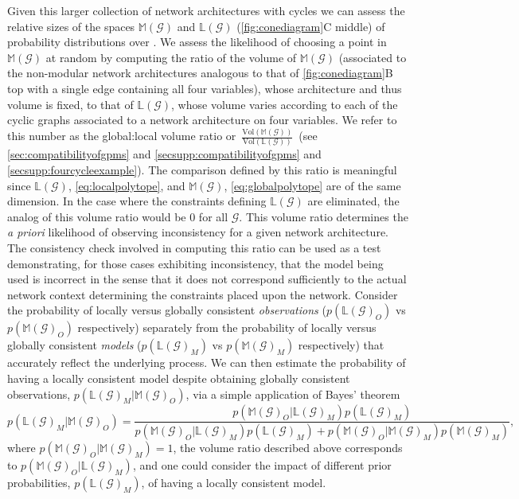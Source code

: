 Given this larger collection of network architectures with cycles we can assess the relative sizes of the spaces $\mathbb{M}(\mathcal{G})$ and $\mathbb{L}(\mathcal{G})$ (\ref{fig:conediagram}C middle) of probability distributions over \gnpm{}. We assess the likelihood of choosing a point in $\mathbb{M}(\mathcal{G})$ at random by computing the ratio of the volume of $\mathbb{M}(\mathcal{G})$ (associated to the non-modular network architectures analogous to that of \ref{fig:conediagram}B top with a single edge containing all four variables), whose architecture and thus volume is fixed, to that of $\mathbb{L}(\mathcal{G})$, whose volume varies according to each of the cyclic graphs associated to a network architecture on four variables. We refer to this number as the global:local volume ratio or~$\frac{\text{Vol}(\mathbb{M}(\mathcal{G}))}{\text{Vol}(\mathbb{L}(\mathcal{G}))}$~(see \ref{sec:compatibilityofgpms} and  \ref{secsupp:compatibilityofgpms} and \ref{secsupp:fourcycleexample}). The comparison defined by this ratio is meaningful since $\mathbb{L}(\mathcal{G})$, \ref{eq:localpolytope}, and $\mathbb{M}(\mathcal{G})$, \ref{eq:globalpolytope} are of the same dimension. In the case where the constraints defining $\mathbb{L}(\mathcal{G})$ are eliminated, the analog of this volume ratio would be $0$ for all $\mathcal{G}$. This volume ratio determines the \emph{a priori} likelihood of observing inconsistency for a given network architecture. The consistency check involved in computing this ratio can be used as a test demonstrating, for those cases exhibiting inconsistency, that the model being used is incorrect in the sense that it does not correspond sufficiently to the actual network context determining the constraints placed upon the network. Consider the probability of locally versus globally consistent \emph{observations} ($p(\mathbb{L}(\mathcal{G})_O)$  vs $p(\mathbb{M}(\mathcal{G})_O)$ respectively) separately from the probability of locally versus globally consistent \emph{models} ($p(\mathbb{L}(\mathcal{G})_M)$  vs $p(\mathbb{M}(\mathcal{G})_M)$ respectively) that accurately reflect the underlying process. We can then estimate the probability of having a locally consistent model despite obtaining globally consistent observations, $p(\mathbb{L}(\mathcal{G})_M | \mathbb{M}(\mathcal{G})_O)$, via a simple application of Bayes' theorem
$$
p(\mathbb{L}(\mathcal{G})_M | \mathbb{M}(\mathcal{G})_O) = \frac{p(\mathbb{M}(\mathcal{G})_O | \mathbb{L}(\mathcal{G})_M)p(\mathbb{L}(\mathcal{G})_M)}{p(\mathbb{M}(\mathcal{G})_O | \mathbb{L}(\mathcal{G})_M)p(\mathbb{L}(\mathcal{G})_M) + p(\mathbb{M}(\mathcal{G})_O | \mathbb{M}(\mathcal{G})_M)p(\mathbb{M}(\mathcal{G})_M)},
$$
where $p(\mathbb{M}(\mathcal{G})_O | \mathbb{M}(\mathcal{G})_M)=1$, the volume ratio described above corresponds to $p(\mathbb{M}(\mathcal{G})_O | \mathbb{L}(\mathcal{G})_M)$, and one could consider the impact of different prior probabilities, $p(\mathbb{L}(\mathcal{G})_M)$, of having a locally consistent model.

